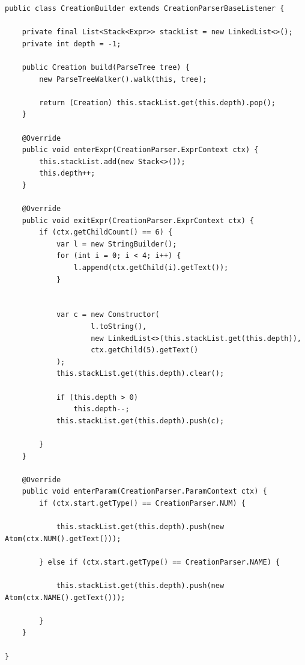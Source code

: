 \begin{lstlisting}[label={lst:Aufgabe2b_Builder}]
public class CreationBuilder extends CreationParserBaseListener {

    private final List<Stack<Expr>> stackList = new LinkedList<>();
    private int depth = -1;

    public Creation build(ParseTree tree) {
        new ParseTreeWalker().walk(this, tree);

        return (Creation) this.stackList.get(this.depth).pop();
    }

    @Override
    public void enterExpr(CreationParser.ExprContext ctx) {
        this.stackList.add(new Stack<>());
        this.depth++;
    }

    @Override
    public void exitExpr(CreationParser.ExprContext ctx) {
        if (ctx.getChildCount() == 6) {
            var l = new StringBuilder();
            for (int i = 0; i < 4; i++) {
                l.append(ctx.getChild(i).getText());
            }


            var c = new Constructor(
                    l.toString(),
                    new LinkedList<>(this.stackList.get(this.depth)),
                    ctx.getChild(5).getText()
            );
            this.stackList.get(this.depth).clear();

            if (this.depth > 0)
                this.depth--;
            this.stackList.get(this.depth).push(c);

        }
    }

    @Override
    public void enterParam(CreationParser.ParamContext ctx) {
        if (ctx.start.getType() == CreationParser.NUM) {

            this.stackList.get(this.depth).push(new Atom(ctx.NUM().getText()));

        } else if (ctx.start.getType() == CreationParser.NAME) {

            this.stackList.get(this.depth).push(new Atom(ctx.NAME().getText()));

        }
    }

}
\end{lstlisting}

